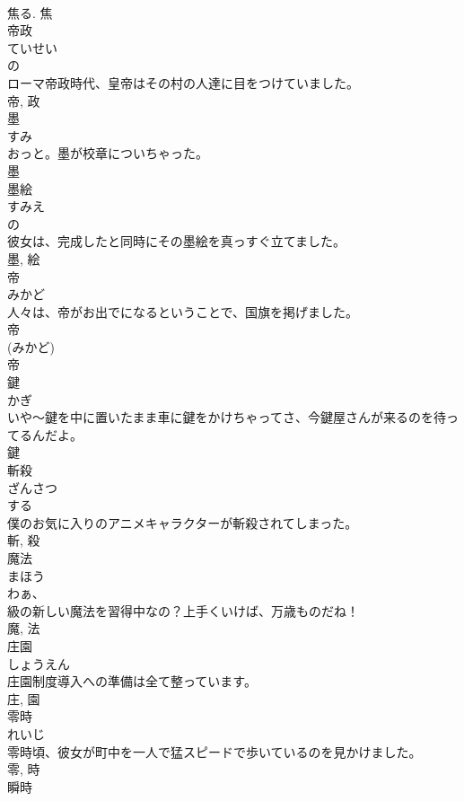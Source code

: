 \documentclass[8pt]{extreport}
\begin{document}
\begin{CJK}{UTF8}{min}
\\	焦る.	焦	
\\	帝政	
\\	ていせい	
\\	の 
\\	ローマ帝政時代、皇帝はその村の人達に目をつけていました。	
\\	帝, 政	
\\	墨	
\\	すみ	
\\	おっと。墨が校章についちゃった。	
\\	墨	
\\	墨絵	
\\	すみえ	
\\	の 
\\	彼女は、完成したと同時にその墨絵を真っすぐ立てました。	
\\	墨, 絵	
\\	帝	
\\	みかど	
\\	人々は、帝がお出でになるということで、国旗を掲げました。	
\\	帝 
\\	(みかど) 
\\	帝	
\\	鍵	
\\	かぎ	
\\	いや〜鍵を中に置いたまま車に鍵をかけちゃってさ、今鍵屋さんが来るのを待ってるんだよ。	
\\	鍵	
\\	斬殺	
\\	ざんさつ	
\\	する 
\\	僕のお気に入りのアニメキャラクターが斬殺されてしまった。	
\\	斬, 殺	
\\	魔法	
\\	まほう	
\\	わぁ、
\\	級の新しい魔法を習得中なの？上手くいけば、万歳ものだね！	
\\	魔, 法	
\\	庄園	
\\	しょうえん	
\\	庄園制度導入への準備は全て整っています。	
\\	庄, 園	
\\	零時	
\\	れいじ	
\\	零時頃、彼女が町中を一人で猛スピードで歩いているのを見かけました。	
\\	零, 時	
\\	瞬時	

\end{CJK}
\end{document}

